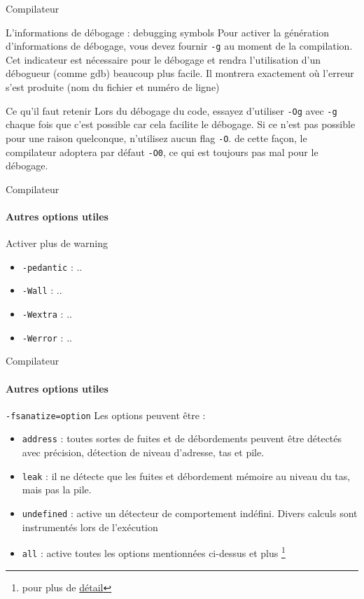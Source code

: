 \begin{frame}{Compilateur}
	\begin{block}{L'informations de débogage : debugging symbols}
		Pour activer la génération \alert{d'informations de débogage}, vous devez fournir \alert{\texttt{-g}} au moment de la compilation. Cet indicateur est nécessaire pour le débogage et rendra l'utilisation d'un débogueur (comme gdb) beaucoup plus facile. Il montrera exactement où l'erreur s'est produite (nom du fichier et numéro de ligne)
	\end{block}
	\begin{alertblock}{Ce qu'il faut retenir}
		Lors du \alert{débogage} du code, essayez d'utiliser \texttt{-Og} avec \texttt{-g} chaque fois que c'est possible car cela facilite le débogage. Si ce n'est pas possible pour une raison quelconque, n'utilisez aucun flag \texttt{-O}. de cette façon, le compilateur adoptera par défaut \texttt{-O0}, ce qui est toujours pas mal pour le débogage.
	\end{alertblock}
\end{frame}

\begin{frame}{Compilateur}
	\framesubtitle{Autres options utiles}
	\begin{block}{Activer plus de warning}
		\begin{itemize}
			\item \texttt{-pedantic} : ..
			\item \texttt{-Wall} : ..
			\item \texttt{-Wextra} : ..
			\item \texttt{-Werror} : ..
		\end{itemize}
	\end{block}
\end{frame}

\begin{frame}{Compilateur}
	\framesubtitle{Autres options utiles}
	\begin{block}{\texttt{-fsanatize=option}}
		Les options peuvent être :
		\begin{itemize}
			\item \alert{\texttt{address}} : toutes sortes de fuites et de débordements peuvent être détectés avec précision, détection de niveau d'adresse, tas et pile.
			\item \alert{\texttt{leak}} : il ne détecte que les fuites et débordement mémoire au niveau du tas, mais pas la pile.
			\item \alert{\texttt{undefined}} : active un détecteur de comportement indéfini. Divers calculs sont instrumentés lors de l'exécution
			\item \alert{\texttt{all}} : active toutes les options mentionnées ci-dessus et plus \footnote[frame]{pour plus de \href{https://gcc.gnu.org/onlinedocs/gcc-5.3.0/gcc/Debugging-Options.html}{détail}}
		\end{itemize}
	\end{block}
\end{frame}

